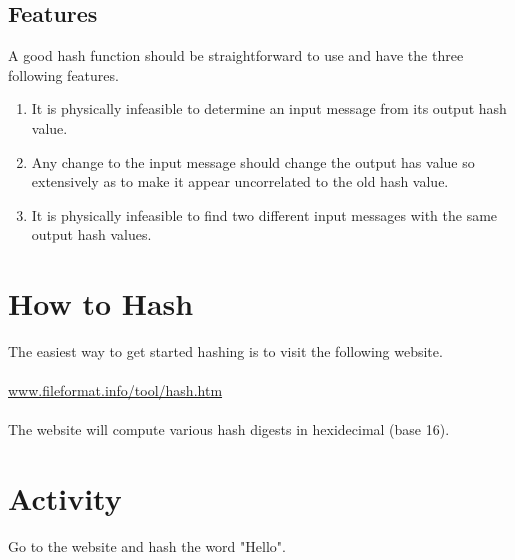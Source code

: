 \documentclass{tufte-handout}
\begin{document}

\subsection{Features}
A good hash function should be straightforward to use and have the three following features.
\begin{enumerate}
\item{It is physically infeasible to determine an input message from its output hash value.}  
\item{Any change to the input message should change the output has value so extensively as to make it appear uncorrelated to the old hash value.}
\item{It is physically infeasible to find two different input messages with the same output hash values.}
\end{enumerate}

\newpage
\section{How to Hash}
The easiest way to get started hashing is to visit the following website.\\ \ \\
\href{url}{www.fileformat.info/tool/hash.htm} \\ \ \\
\noindent The website will compute various hash digests in hexidecimal (base 16).

\section{Activity}
\noindent Go to the website and hash the word "Hello".  \\ \ \\
\end{document}
